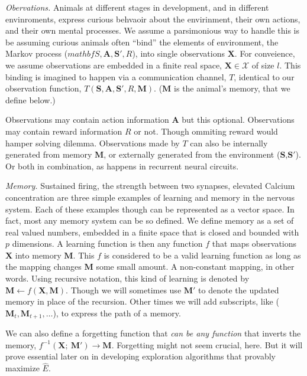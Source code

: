 \emph{Obervations.} Animals at different stages in development, and in different envinroments, express curious behvaoir about the envirinment, their own actions, and their own mental processes. We assume a parsimonious way to handle this is be assuming curious animals often ``bind'' \cite{Robertson2003} the elements of environment, the Markov process ($mathbf{S},\mathbf{A},\mathbf{S'},R$), into single observations $\mathbf{X}$. For conveience, we assume observations are embedded in a finite real space, $\mathbf{X} \in \mathcal{X}$ of size $l$. This binding is imagined to happen via a communication channel, $T$, identical to our observation function, $T(\mathbf{S},\mathbf{A},\mathbf{S'},R,\mathbf{M})$. ($\mathbf{M}$ is the animal's memory, that we define below.)

Observations may contain action information $\mathbf{A}$ but this optional. Observations may contain reward information $R$ or not. Though ommiting reward would hamper solving dilemma. Observations made by $T$ can also be internally generated from memory $\mathbf{M}$, or externally generated from the environment ($\mathbf{S}$,$\mathbf{S'}$). Or both in combination, as happens in recurrent neural circuits. 

\emph{Memory.} Sustained firing, the strength between two synapses, elevated Calcium concentration are three simple examples of learning and memory in the nervous system. Each of these examples though can be represented as a vector space. In fact, most any memory system can be so defined. We define memory as a set of real valued numbers, embedded in a finite space that is closed and bounded with $p$ dimensions. A learning function is then any function $f$ that maps observations $\mathbf{X}$ into memory $\mathbf{M}$. This $f$ is considered to be a valid learning function as long as the mapping changes $\mathbf{M}$ some small amount. A non-constant mapping, in other words. Using recursive notation, this kind of learning is denoted by $\mathbf{M} \leftarrow f(\mathbf{X},\mathbf{M}) $. Though we will sometimes use $\mathbf{M'}$ to denote the updated memory in place of the recursion. Other times we will add subscripts, like ($\mathbf{M}_t,\mathbf{M}_{t+1},\ldots$), to express the path of a memory.

We can also define a forgetting function that \textit{can be any function} that inverts the memory, $f^{-1}(\mathbf{X};\ \mathbf{M}') \rightarrow \mathbf{M}$. Forgetting might not seem crucial, here. But it will prove essential later on in developing exploration algorithms that provably maximize $\hat E$. 

